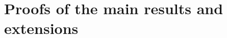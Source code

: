 \documentclass[11pt,a4paper,oneside]{article}
\newcommand{\e}{{\rm e}}
\newcommand{\dd}{\mathrm d}
\newcommand{\partder}[1]{\frac{\partial}{ \partial #1}}
\newcommand{\E}{E}
\newcommand{\X}{\mathbb{X}}
\newcommand{\R}{\mathbb{R}}
\theoremstyle{definition}
\theoremstyle{remark}
\begin{document}
\section{Proofs of the main results and extensions}



    

\end{document}
